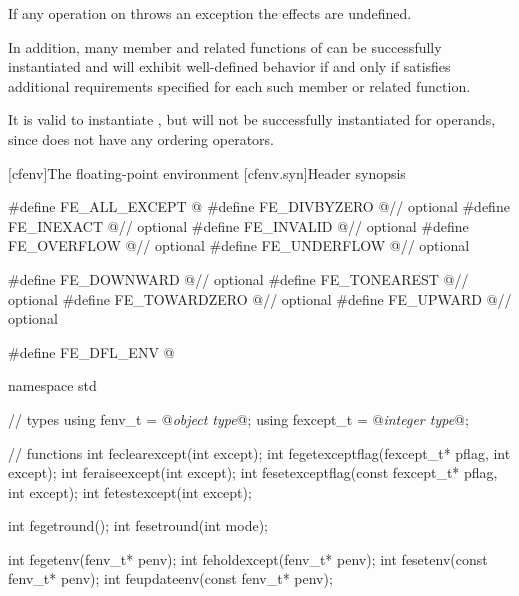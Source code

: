 \pnum
If any operation on 
throws an exception the effects are undefined.

\pnum
In addition, many member and related functions of
can be successfully instantiated
and will exhibit well-defined behavior if and only if
 satisfies additional requirements specified for each such member
or related function.

\pnum
\begin{example}
It is valid to instantiate
,
but
will not be successfully instantiated for
operands, since
does not have any ordering operators.
\end{example}

[cfenv]{The floating-point environment}
[cfenv.syn]{Header  synopsis}
%

%
%
%
%
%
%
%
%
%
%
%
%
%
%
%
%
%
%
%
%
%
%
%
%
\begin{codeblock}
#define FE_ALL_EXCEPT @\seebelow@
#define FE_DIVBYZERO @\seebelow@    // optional
#define FE_INEXACT @\seebelow@      // optional
#define FE_INVALID @\seebelow@      // optional
#define FE_OVERFLOW @\seebelow@     // optional
#define FE_UNDERFLOW @\seebelow@    // optional

#define FE_DOWNWARD @\seebelow@     // optional
#define FE_TONEAREST @\seebelow@    // optional
#define FE_TOWARDZERO @\seebelow@   // optional
#define FE_UPWARD @\seebelow@       // optional

#define FE_DFL_ENV @\seebelow@

namespace std {
  // types
  using fenv_t    = @\textit{object type}@;
  using fexcept_t = @\textit{integer type}@;

  // functions
  int feclearexcept(int except);
  int fegetexceptflag(fexcept_t* pflag, int except);
  int feraiseexcept(int except);
  int fesetexceptflag(const fexcept_t* pflag, int except);
  int fetestexcept(int except);

  int fegetround();
  int fesetround(int mode);

  int fegetenv(fenv_t* penv);
  int feholdexcept(fenv_t* penv);
  int fesetenv(const fenv_t* penv);
  int feupdateenv(const fenv_t* penv);
}
\end{codeblock}

